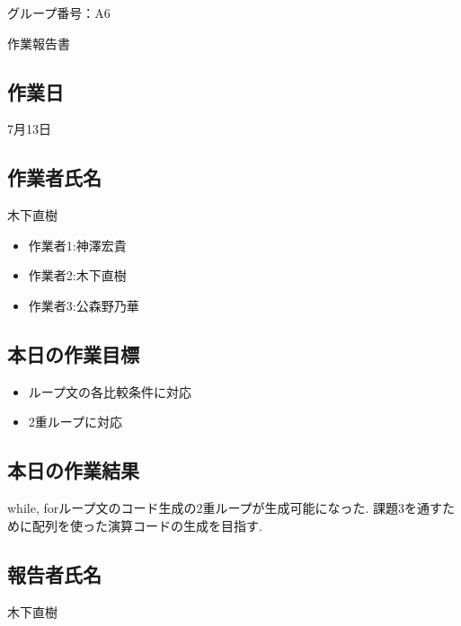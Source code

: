 \documentclass[a4j]{jarticle}
\begin{document}
\thispagestyle{empty}

\begin{flushright}
グループ番号：A6
\end{flushright}

\begin{center}
{\LARGE 作業報告書}
\end{center}

\subsection*{作業日}

7月13日


\subsection*{作業者氏名}
木下直樹

\begin{itemize}
  \item 作業者1:神澤宏貴
  \item 作業者2:木下直樹
  \item 作業者3:公森野乃華
\end{itemize}

\subsection*{本日の作業目標}
\begin{itemize}
\item ループ文の各比較条件に対応
\item 2重ループに対応

\end{itemize}

\subsection*{本日の作業結果}
while, forループ文のコード生成の2重ループが生成可能になった.
課題3を通すために配列を使った演算コードの生成を目指す.

\subsection*{報告者氏名}

木下直樹
\end{document}

